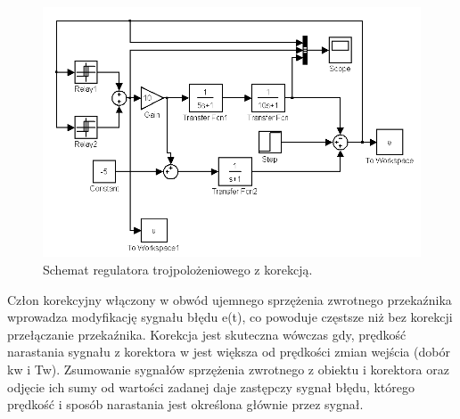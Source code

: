 \documentclass[a4paper,10pt]{article}
\begin{document}
\begin{figure}[!h]
    \centering
	\includegraphics[width=120mm]{CW3-schemat-3k.PNG}
	\caption{Schemat regulatora trojpolożeniowego z korekcją.}
    \label{fig:Rysunek}
\end{figure}
Człon korekcyjny włączony w obwód ujemnego sprzężenia zwrotnego przekaźnika wprowadza modyfikację sygnału
błędu e(t), co powoduje częstsze niż bez korekcji przełączanie przekaźnika. Korekcja jest skuteczna
wówczas gdy, prędkość narastania sygnału z korektora w jest większa od prędkości zmian wejścia (dobór kw i Tw). Zsumowanie sygnałów sprzężenia zwrotnego z obiektu i korektora oraz odjęcie ich sumy od wartości zadanej daje zastępczy sygnał błędu, którego prędkość i sposób narastania jest określona głównie przez sygnał. 

\newpage
\end{document}
